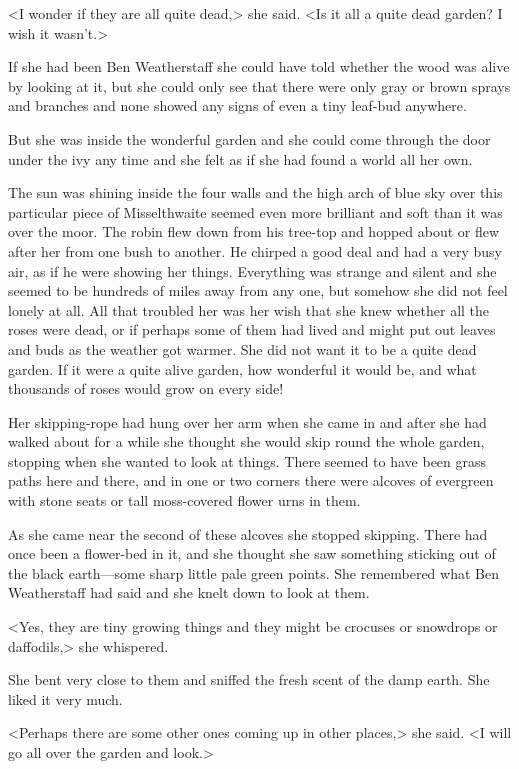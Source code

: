<I wonder if they are all quite dead,> she said. <Is it all a quite dead garden? I wish it wasn't.>

If she had been Ben Weatherstaff she could have told whether the wood was alive by looking at it, but she could only see that there were only gray or brown sprays and branches and none showed any signs of even a tiny leaf-bud anywhere.

But she was inside the wonderful garden and she could come through the door under the ivy any time and she felt as if she had found a world all her own.

The sun was shining inside the four walls and the high arch of blue sky over this particular piece of Misselthwaite seemed even more brilliant and soft than it was over the moor. The robin flew down from his tree-top and hopped about or flew after her from one bush to another. He chirped a good deal and had a very busy air, as if he were showing her things. Everything was strange and silent and she seemed to be hundreds of miles away from any one, but somehow she did not feel lonely at all. All that troubled her was her wish that she knew whether all the roses were dead, or if perhaps some of them had lived and might put out leaves and buds as the weather got warmer. She did not want it to be a quite dead garden. If it were a quite alive garden, how wonderful it would be, and what thousands of roses would grow on every side!

Her skipping-rope had hung over her arm when she came in and after she had walked about for a while she thought she would skip round the whole garden, stopping when she wanted to look at things. There seemed to have been grass paths here and there, and in one or two corners there were alcoves of evergreen with stone seats or tall moss-covered flower urns in them.

As she came near the second of these alcoves she stopped skipping. There had once been a flower-bed in it, and she thought she saw something sticking out of the black earth—some sharp little pale green points. She remembered what Ben Weatherstaff had said and she knelt down to look at them.

<Yes, they are tiny growing things and they might be crocuses or snowdrops or daffodils,> she whispered.

She bent very close to them and sniffed the fresh scent of the damp earth. She liked it very much.

<Perhaps there are some other ones coming up in other places,> she said. <I will go all over the garden and look.>

